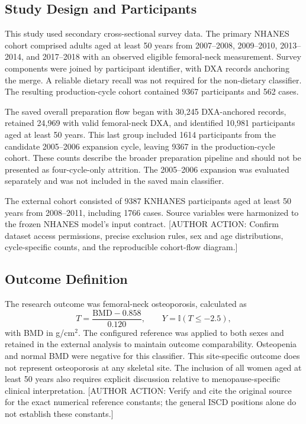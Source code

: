 \documentclass[11pt,a4paper]{article}
\newcommand{\pending}[1]{\textcolor{red!65!black}{[AUTHOR ACTION: #1]}}
\begin{document}
\subsection{Study Design and Participants}
This study used secondary cross-sectional survey data. The primary NHANES cohort comprised adults aged at least 50 years from 2007--2008, 2009--2010, 2013--2014, and 2017--2018 with an observed eligible femoral-neck measurement. Survey components were joined by participant identifier, with DXA records anchoring the merge. A reliable dietary recall was not required for the non-dietary classifier. The resulting production-cycle cohort contained 9367 participants and 562 cases.

The saved overall preparation flow began with 30,245 DXA-anchored records, retained 24,969 with valid femoral-neck DXA, and identified 10,981 participants aged at least 50 years. This last group included 1614 participants from the candidate 2005--2006 expansion cycle, leaving 9367 in the production-cycle cohort. These counts describe the broader preparation pipeline and should not be presented as four-cycle-only attrition. The 2005--2006 expansion was evaluated separately and was not included in the saved main classifier.

The external cohort consisted of 9387 KNHANES participants aged at least 50 years from 2008--2011, including 1766 cases. Source variables were harmonized to the frozen NHANES model's input contract. \pending{Confirm dataset access permissions, precise exclusion rules, sex and age distributions, cycle-specific counts, and the reproducible cohort-flow diagram.}

\subsection{Outcome Definition}
The research outcome was femoral-neck osteoporosis, calculated as
\begin{equation}
T=\frac{\mathrm{BMD}-0.858}{0.120},\qquad Y=\mathbb{I}(T\leq-2.5),
\end{equation}
with BMD in g/cm$^2$. The configured reference was applied to both sexes and retained in the external analysis to maintain outcome comparability. Osteopenia and normal BMD were negative for this classifier. This site-specific outcome does not represent osteoporosis at any skeletal site. The inclusion of all women aged at least 50 years also requires explicit discussion relative to menopause-specific clinical interpretation. \pending{Verify and cite the original source for the exact numerical reference constants; the general ISCD positions alone do not establish these constants.}
\end{document}
